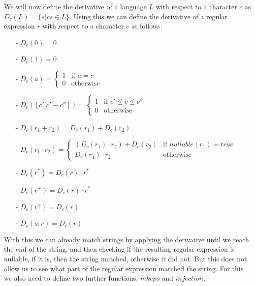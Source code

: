 We will now define the derivative of a language $L$ with respect to a character $c$ as $D_c(L) = \{s | cs \in L\}$.
Using this we can define the derivative of a regular expression $r$ with respect to a character $c$ as follows:
\begin{enumerate}
    \item[-] $D_c(0) = 0$
    \item[-] $D_c(1) = 0$
    \item[-] $D_c(a) = \begin{cases}
        1 & \text{if } a = c \\
        0 & \text{otherwise}
    \end{cases}$
    \item[-] $D_c([c'|c'-c'']) = \begin{cases}
        1 & \text{if } c' \leq c \leq c'' \\
        0 & \text{otherwise}
    \end{cases}$
    \item[-] $D_c(r_1 + r_2) = D_c(r_1) + D_c(r_2)$
    \item[-] $D_c(r_1 \cdot r_2) = \begin{cases}
        (D_c(r_1) \cdot r_2) + D_c(r_2) & \text{if } nullable(r_1) = true \\
        D_c(r_1) \cdot r_2 & \text{otherwise}
    \end{cases}$
    \item[-] $D_c(r^*) = D_c(r) \cdot r^*$
    \item[-] $D_c(r^+) = D_c(r) \cdot r^*$
    \item[-] $D_c(r?) = D_c(r)$
    \item[-] $D_c(s:r) = D_c(r)$
\end{enumerate}

With this we can already match strings by applying the derivative until we reach the end of the string, and then checking if the resulting regular expression is nullable, if it is, then the string matched, otherwise it did not.
But this does not allow us to see what part of the regular expression matched the string.
For this we also need to define two further functions, $mkeps$ and $injection$.

